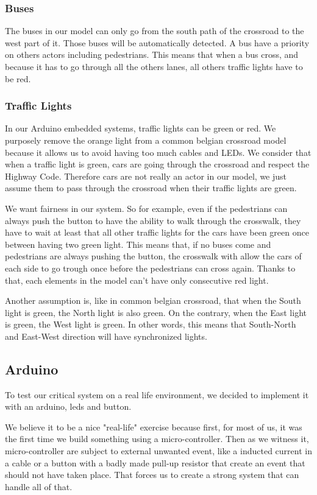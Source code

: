 \subsubsection{Buses}
The buses in our model can only go from the south path of the crossroad to the west part of it. Those buses will be automatically detected. A bus have a priority on others actors including pedestrians. This means that when a bus cross, and because it has to go through all the others lanes, all others traffic lights have to be red.

\subsubsection{Traffic Lights}
In our Arduino embedded systems, traffic lights can be green or red. We purposely remove the orange light from a common belgian crossroad model because it allows us to avoid having too much cables and LEDs. We consider that when a traffic light is green, cars are going through the crossroad and respect the Highway Code. Therefore cars are not really an actor in our model, we just assume them to pass through the crossroad when their traffic lights are green. 

We want fairness in our system. So for example, even if the pedestrians can always push the button to have the ability to walk through the crosswalk, they have to wait at least that all other traffic lights for the cars have been green once between having two green light. This means that, if no buses come and pedestrians are always pushing the button, the crosswalk with allow the cars of each side to go trough once before the pedestrians can cross again. Thanks to that, each elements in the model can't have only consecutive red light.

Another assumption is, like in common belgian crossroad, that when the South light is green, the North light is also green. On the contrary, when the East light is green, the West light is green. In other words, this means that South-North and East-West direction will have synchronized lights.


\subsection{Arduino}

To test our critical system on a real life environment, we decided to implement it with an arduino, leds and button.

We believe it to be a nice "real-life" exercise because first, for most of us, it was the first time we build something using a micro-controller. Then as we witness it, micro-controller are subject to external unwanted event, like a inducted current in a cable or a button with a badly made pull-up resistor that create an event that should not have taken place. That forces us to create a strong system that can handle all of that.


